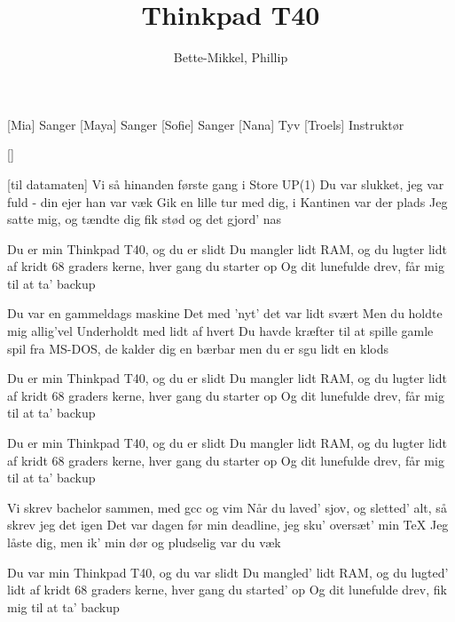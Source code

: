\documentclass[a4paper,11pt]{article}
\title{Thinkpad T40}
\author{Bette-Mikkel, Phillip}
\begin{document}
\maketitle

\begin{roles}
[Mia] Sanger 
[Maya] Sanger 
[Sofie] Sanger 
[Nana] Tyv
[Troels] Instruktør
\end{roles}

\begin{props}
[]
\end{props}

\begin{song}

[til datamaten]
Vi så hinanden første gang
i Store UP(1)
Du var slukket, jeg var fuld -
din ejer han var væk
Gik en lille tur med dig,
i Kantinen var der plads
Jeg satte mig, og tændte dig
fik stød og det gjord' nas



Du er min Thinkpad T40, og du er slidt
Du mangler lidt RAM, og du lugter lidt af kridt
68 graders kerne, hver gang du starter op
Og dit lunefulde drev, får mig til at ta' backup

Du var en gammeldags maskine
Det med 'nyt' det var lidt svært
Men du holdte mig allig'vel
Underholdt med lidt af hvert
Du havde kræfter til at spille
gamle spil fra MS-DOS,
de kalder dig en bærbar
men du er sgu lidt en klods

Du er min Thinkpad T40, og du er slidt
Du mangler lidt RAM, og du lugter lidt af kridt
68 graders kerne, hver gang du starter op
Og dit lunefulde drev, får mig til at ta' backup


Du er min Thinkpad T40, og du er slidt
Du mangler lidt RAM, og du lugter lidt af kridt
68 graders kerne, hver gang du starter op
Og dit lunefulde drev, får mig til at ta' backup

Vi skrev bachelor sammen,
med gcc og vim
Når du laved' sjov, og sletted' alt,
så skrev jeg det igen
Det var dagen før min deadline,
jeg sku' oversæt' min TeX
Jeg låste dig, men ik' min dør
og pludselig var du væk

Du var min Thinkpad T40, og du var slidt
Du mangled' lidt RAM, og du lugted' lidt af kridt
68 graders kerne, hver gang du started' op
Og dit lunefulde drev, fik mig til at ta' backup
\end{song}
\end{document}
